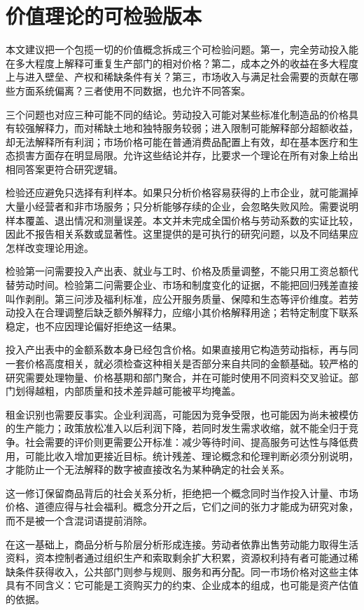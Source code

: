 \documentclass[UTF8,fontset=fandol,zihao=-4,oneside,openany]{ctexbook}
\begin{document}
\section{价值理论的可检验版本}
本文建议把一个包揽一切的价值概念拆成三个可检验问题。第一，完全劳动投入能在多大程度上解释可重复生产部门的相对价格？第二，成本之外的收益在多大程度上与进入壁垒、产权和稀缺条件有关？第三，市场收入与满足社会需要的贡献在哪些方面系统偏离？三者使用不同数据，也允许不同答案。

\label{arg:P053}
三个问题也对应三种可能不同的结论。劳动投入可能对某些标准化制造品的价格具有较强解释力，而对稀缺土地和独特服务较弱；进入限制可能解释部分超额收益，却无法解释所有利润；市场价格可能在普通消费品配置上有效，却在基本医疗和生态损害方面存在明显局限。允许这些结论并存，比要求一个理论在所有对象上给出相同答案更符合研究逻辑。

检验还应避免只选择有利样本。如果只分析价格容易获得的上市企业，就可能漏掉大量小经营者和非市场服务；只分析能够存续的企业，会忽略失败风险。需要说明样本覆盖、退出情况和测量误差。本文并未完成全国价格与劳动系数的实证比较，因此不报告相关系数或显著性。这里提供的是可执行的研究问题，以及不同结果应怎样改变理论用途。

检验第一问需要投入产出表、就业与工时、价格及质量调整，不能只用工资总额代替劳动时间。检验第二问需要企业、市场和制度变化的证据，不能把回归残差直接叫作剥削。第三问涉及福利标准，应公开服务质量、保障和生态等评价维度。若劳动投入在合理调整后缺乏额外解释力，应缩小其价格解释用途；若特定制度下联系稳定，也不应因理论偏好拒绝这一结果。

\label{arg:P054}
投入产出表中的金额系数本身已经包含价格。如果直接用它构造劳动指标，再与同一套价格高度相关，就必须检查这种相关是否部分来自共同的金额基础。较严格的研究需要处理物量、价格基期和部门聚合，并在可能时使用不同资料交叉验证。部门划得越粗，内部质量和技术差异越可能被平均掩盖。

租金识别也需要反事实。企业利润高，可能因为竞争受限，也可能因为尚未被模仿的生产能力；政策放松准入以后利润下降，若同时发生需求收缩，就不能全归于竞争。社会需要的评价则更需要公开标准：减少等待时间、提高服务可达性与降低费用，可能比收入增加更接近目标。统计残差、理论概念和伦理判断必须分别说明，才能防止一个无法解释的数字被直接改名为某种确定的社会关系。

这一修订保留商品背后的社会关系分析，拒绝把一个概念同时当作投入计量、市场价格、道德应得与社会福利。概念分开之后，它们之间的张力才能成为研究对象，而不是被一个含混词语提前消除。

\label{arg:P055}
在这一基础上，商品分析与阶层分析形成连接。劳动者依靠出售劳动能力取得生活资料，资本控制者通过组织生产和索取剩余扩大积累，资源权利持有者可能通过稀缺条件获得收入，公共部门则参与规则、服务和再分配。同一市场价格对这些主体具有不同含义：它可能是工资购买力的约束、企业成本的组成，也可能是资产估值的依据。
\end{document}
